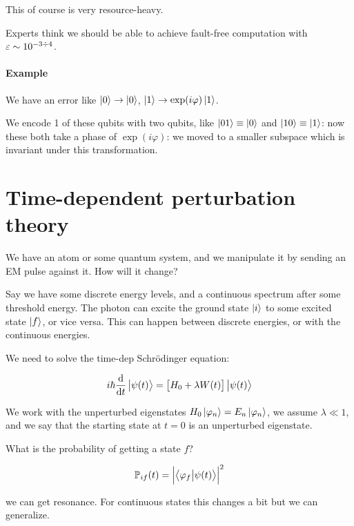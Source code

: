 \documentclass[main.tex]{subfiles}
\begin{document}
This of course is very resource-heavy.

Experts think we should be able to achieve fault-free computation with \(\varepsilon \sim 10 ^{-3 \divisionsymbol 4} \).

\paragraph{Example} \label{par:error-correction-phase}

We have an error like \(\ket{0} \rightarrow \ket{0}\), \(\ket{1} \rightarrow \exp(i \varphi) \ket{1}\).

We encode 1 of these qubits with two qubits, like \(\ket{01} \equiv \ket{0}\) and \(\ket{10} \equiv \ket{1}\): now these both take a phase of \(\exp(i \varphi) \): we moved to a smaller subspace which is invariant under this transformation.

\section{Time-dependent perturbation theory}

We have an atom or some quantum system, and we manipulate it by sending an EM pulse against it. How will it change?

Say we have some discrete energy levels, and a continuous spectrum after some threshold energy.
The photon can excite the ground state \(\ket{i} \) to some excited state \(\ket{f} \), or vice versa.
This can happen between discrete energies, or with the continuous energies.

We need to solve the time-dep Schrödinger equation:

\begin{equation}
    i \hbar \dv{}{t} \ket{\psi(t)} = \qty[H_0 + \lambda W(t)]\ket{\psi(t)}
\end{equation}

We work with the unperturbed eigenstates \(H_0 \ket{\varphi_n}  = E_n \ket{\varphi_n}  \), we assume \(\lambda \ll 1\),
and we say that the starting state at \(t=0\) is an unperturbed eigenstate.

What is the probability of getting a state \(f\)?

\begin{equation}
    \mathbb{P} _{if}(t) = \abs{\braket{\varphi_f}{\psi(t)} }^2
\end{equation}

we can get resonance.
For continuous states this changes a bit but we can generalize.
\end{document}
